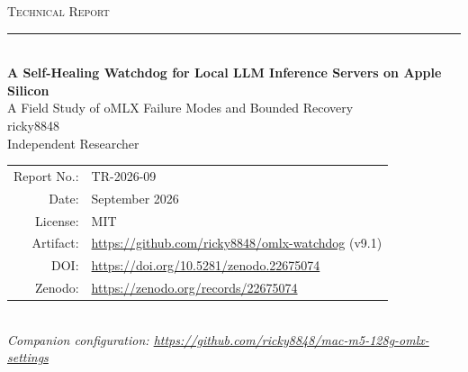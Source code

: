 \documentclass[10pt]{article}
\newcommand{\techreportnumber}{TR-2026-09}
\begin{document}
\begin{titlepage}
  \centering
  \vspace*{1.2cm}

  {\large\textsc{Technical Report}}\\[0.3em]
  \rule{\linewidth}{1pt}\\[0.5em]

  {\Huge\bfseries
    A Self-Healing Watchdog for Local LLM Inference Servers on Apple Silicon}\\[0.6em]

  {\Large A Field Study of oMLX Failure Modes and Bounded Recovery}\\[1.2em]

  {\large ricky8848}\\[0.3em]
  {\normalsize Independent Researcher}\\[2em]

  \begin{tabular}{rl}
    Report No.: & \techreportnumber \\[0.3em]
    Date:       & September 2026\\[0.3em]
    License:    & MIT \\[0.3em]
    Artifact:   & \url{https://github.com/ricky8848/omlx-watchdog} (v9.1)\\[0.3em]
    DOI:        & \url{https://doi.org/10.5281/zenodo.22675074}\\[0.3em]
    Zenodo:     & \url{https://zenodo.org/records/22675074}
  \end{tabular}\\[2em]

  {\small\itshape
    Companion configuration: \url{https://github.com/ricky8848/mac-m5-128g-omlx-settings}}

  \vfill
\end{titlepage}
\end{document}

